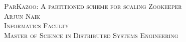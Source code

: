 \textsc{\LARGE ParKazoo: A partitioned scheme for scaling Zookeeper\\}
\textsc{Arjun Naik\\}
\textsc{\Large Informatics Faculty\\}
\textsc{\Large Master of Science in Distributed Systems Engineering}